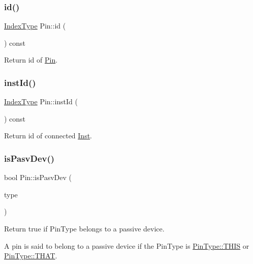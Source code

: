 \subsubsection{\texorpdfstring{id()}{id()}}
{\footnotesize\ttfamily \hyperlink{type_8h_a581e8093e28e7362f2b6937296190676}{Index\+Type} Pin\+::id (\begin{DoxyParamCaption}{ }\end{DoxyParamCaption}) const\hspace{0.3cm}{\ttfamily [inline]}}

Return id of \hyperlink{classPin}{Pin}. \mbox{\label{classPin_a8ddc3b130a28cbc1781b155dea8c333e}} 
\subsubsection{\texorpdfstring{inst\+Id()}{instId()}}
{\footnotesize\ttfamily \hyperlink{type_8h_a581e8093e28e7362f2b6937296190676}{Index\+Type} Pin\+::inst\+Id (\begin{DoxyParamCaption}{ }\end{DoxyParamCaption}) const\hspace{0.3cm}{\ttfamily [inline]}}

Return id of connected \hyperlink{classInst}{Inst}. \mbox{\label{classPin_abfab9edd97a71fe12e0bb76ac2ea109a}} 
\subsubsection{\texorpdfstring{is\+Pasv\+Dev()}{isPasvDev()}}
{\footnotesize\ttfamily bool Pin\+::is\+Pasv\+Dev (\begin{DoxyParamCaption}\item[{\hyperlink{type_8h_afaab50027002ecbb6c8ac27e727d1bb4}{Pin\+Type}}]{type }\end{DoxyParamCaption})\hspace{0.3cm}{\ttfamily [static]}}

Return true if Pin\+Type belongs to a passive device.

A pin is said to belong to a passive device if the Pin\+Type is \hyperlink{type_8h_afaab50027002ecbb6c8ac27e727d1bb4ac9f869114804f0a61ce9b03def9d71f5}{Pin\+Type\+::\+T\+H\+IS} or \hyperlink{type_8h_afaab50027002ecbb6c8ac27e727d1bb4a13d613e84b1e7d08d869695a750caf23}{Pin\+Type\+::\+T\+H\+AT}. \mbox{\label{classPin_a5bcc2c816d52b915690738820c4042b3}} 
